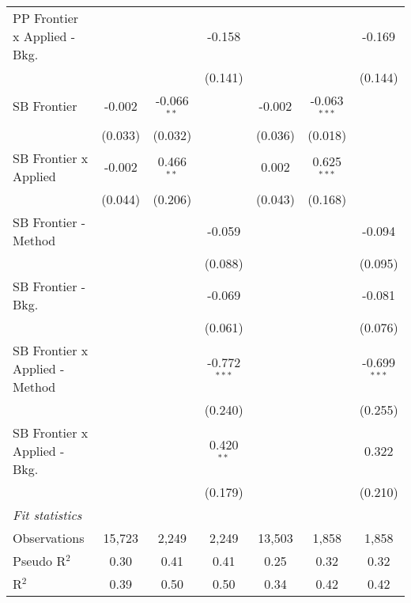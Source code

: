 \begin{tabular}{lcccccc}
   PP Frontier x Applied - Bkg.   &         &               & -0.158         &              &                & -0.169\\   
                                  &         &               & (0.141)        &              &                & (0.144)\\   
   SB Frontier                    & -0.002  & -0.066$^{**}$ &                & -0.002       & -0.063$^{***}$ &   \\   
                                  & (0.033) & (0.032)       &                & (0.036)      & (0.018)        &   \\   
   SB Frontier x Applied          & -0.002  & 0.466$^{**}$  &                & 0.002        & 0.625$^{***}$  &   \\   
                                  & (0.044) & (0.206)       &                & (0.043)      & (0.168)        &   \\   
   SB Frontier - Method           &         &               & -0.059         &              &                & -0.094\\   
                                  &         &               & (0.088)        &              &                & (0.095)\\   
   SB Frontier - Bkg.             &         &               & -0.069         &              &                & -0.081\\   
                                  &         &               & (0.061)        &              &                & (0.076)\\   
   SB Frontier x Applied - Method &         &               & -0.772$^{***}$ &              &                & -0.699$^{***}$\\   
                                  &         &               & (0.240)        &              &                & (0.255)\\   
   SB Frontier x Applied - Bkg.   &         &               & 0.420$^{**}$   &              &                & 0.322\\   
                                  &         &               & (0.179)        &              &                & (0.210)\\   
   \midrule
   \emph{Fit statistics}\\
   Observations                   & 15,723  & 2,249         & 2,249          & 13,503       & 1,858          & 1,858\\  
   Pseudo R$^2$                   & 0.30    & 0.41          & 0.41           & 0.25         & 0.32           & 0.32\\  
   R$^2$                          & 0.39    & 0.50          & 0.50           & 0.34         & 0.42           & 0.42\\  
   

\end{tabular}
